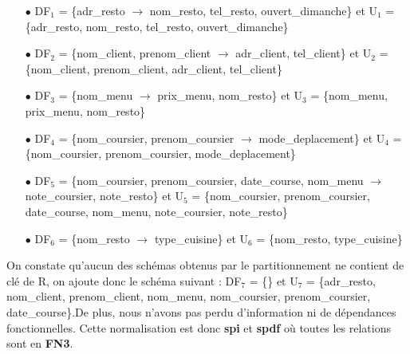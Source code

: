 \documentclass[french]{article}
\begin{document}
                \begin{itemize}
                    \item[$\bullet$] DF$_{1}$ = \{adr\_resto $\rightarrow$ nom\_resto, tel\_resto, ouvert\_dimanche\} \newline et U$_{1}$ = \{adr\_resto, nom\_resto, tel\_resto, ouvert\_dimanche\}
                    
                    \item[$\bullet$] DF$_{2}$ = \{nom\_client, prenom\_client $\rightarrow$ adr\_client, tel\_client\} \newline et U$_{2}$ = \{nom\_client, prenom\_client, adr\_client, tel\_client\}
                    
                    \item[$\bullet$] DF$_{3}$ = \{nom\_menu $\rightarrow$ prix\_menu, nom\_resto\} \newline et U$_{3}$ = \{nom\_menu, prix\_menu, nom\_resto\}
                    
                    \item[$\bullet$] DF$_{4}$ = \{nom\_coursier, prenom\_coursier $\rightarrow$  mode\_deplacement\} \newline et U$_{4}$ = \{nom\_coursier, prenom\_coursier, mode\_deplacement\}
                    
                    \item[$\bullet$] DF$_{5}$ = \{nom\_coursier, prenom\_coursier, date\_course, nom\_menu $\rightarrow$ note\_coursier, \newline note\_resto\} 
                    \newline et U$_{5}$ = \{nom\_coursier, prenom\_coursier, date\_course, nom\_menu, note\_coursier, \newline note\_resto\}
                    
                    \item[$\bullet$] DF$_{6}$ = \{nom\_resto $\rightarrow$ type\_cuisine\} et U$_{6}$ = \{nom\_resto, type\_cuisine\}
                \end{itemize}
                
                \noindent
                On constate qu'aucun des schémas obtenus par le partitionnement ne contient de clé de R, on ajoute donc le schéma suivant :\newline
                DF$_{7}$ = \{\} et U$_{7}$ = \{adr\_resto, nom\_client, prenom\_client, nom\_menu, nom\_coursier, \newline prenom\_coursier, date\_course\}.\newline De plus, nous n'avons pas perdu d'information ni de dépendances fonctionnelles. Cette normalisation est donc \textbf{spi} et \textbf{spdf} où toutes les relations sont en \textbf{FN3}.
            
\end{document}
